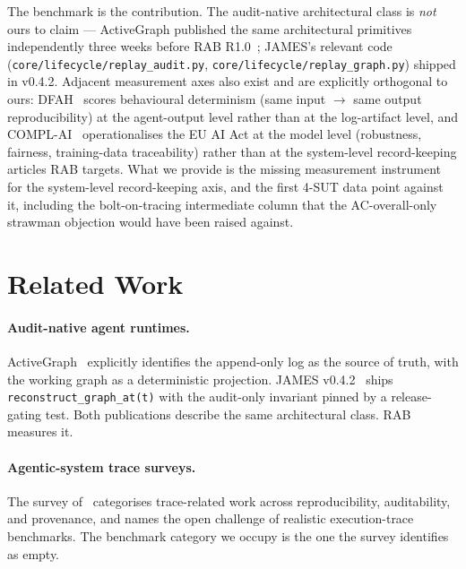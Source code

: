 \documentclass[11pt,a4paper]{article}
\begin{document}
The benchmark is the contribution. The audit-native architectural class is \emph{not} ours to claim --- ActiveGraph published the same architectural primitives independently three weeks before RAB R1.0~\cite{nakajima2026activegraph}; JAMES's relevant code (\texttt{core/lifecycle/replay\_audit.py}, \texttt{core/lifecycle/replay\_graph.py}) shipped in v0.4.2. Adjacent measurement axes also exist and are explicitly orthogonal to ours: DFAH~\cite{khatchadourian2026dfah} scores behavioural determinism (same input $\to$ same output reproducibility) at the agent-output level rather than at the log-artifact level, and COMPL-AI~\cite{guldimann2024complai} operationalises the EU AI Act at the model level (robustness, fairness, training-data traceability) rather than at the system-level record-keeping articles RAB targets. What we provide is the missing measurement instrument for the system-level record-keeping axis, and the first 4-SUT data point against it, including the bolt-on-tracing intermediate column that the AC-overall-only strawman objection would have been raised against.

\section{Related Work}
\label{sec:related}

\paragraph{Audit-native agent runtimes.} ActiveGraph~\cite{nakajima2026activegraph} explicitly identifies the append-only log as the source of truth, with the working graph as a deterministic projection. JAMES v0.4.2~\cite{seo2026jamesv043} ships \texttt{reconstruct\_graph\_at(t)} with the audit-only invariant pinned by a release-gating test. Both publications describe the same architectural class. RAB measures it.

\paragraph{Agentic-system trace surveys.} The survey of~\cite{wang2026evidencetrace} categorises trace-related work across reproducibility, auditability, and provenance, and names the open challenge of realistic execution-trace benchmarks. The benchmark category we occupy is the one the survey identifies as empty.
\end{document}
